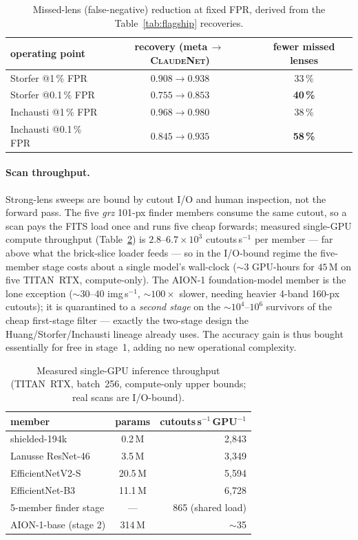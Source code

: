 \documentclass[11pt,letterpaper]{article}
\newcommand{\cnet}{\textsc{ClaudeNet}}
\newcommand{\aion}{\textsc{AION-1}}
\begin{document}
\begin{table}[t]\centering
\caption{Missed-lens (false-negative) reduction at fixed FPR, derived from the
Table~\ref{tab:flagship} recoveries.}
\label{tab:impact}
\begin{tabular}{lcc}
\toprule
operating point & recovery (meta$\,\to\,$\cnet{}) & fewer missed lenses\\
\midrule
Storfer @1\,\% FPR     & $0.908\to0.938$ & 33\,\%\\
Storfer @0.1\,\% FPR   & $0.755\to0.853$ & \textbf{40\,\%}\\
Inchausti @1\,\% FPR   & $0.968\to0.980$ & 38\,\%\\
Inchausti @0.1\,\% FPR & $0.845\to0.935$ & \textbf{58\,\%}\\
\bottomrule
\end{tabular}
\end{table}

\paragraph{Scan throughput.} Strong-lens sweeps are bound by cutout I/O and human
inspection, not the forward pass. The five \emph{grz} 101-px finder members consume
the same cutout, so a scan pays the FITS load once and runs five cheap forwards;
measured single-GPU compute throughput (Table~\ref{tab:throughput}) is
$2.8$--$6.7\times10^{3}$ cutouts\,s$^{-1}$ per member --- far above what the
brick-slice loader feeds --- so in the I/O-bound regime the five-member stage costs
about a single model's wall-clock ($\sim$3 GPU-hours for $45$\,M on five TITAN~RTX,
compute-only). The \aion{} foundation-model member is the lone exception
($\sim$30--40 img\,s$^{-1}$, $\sim$$100\times$ slower, needing heavier 4-band 160-px
cutouts); it is quarantined to a \emph{second stage} on the $\sim$$10^{4}$--$10^{6}$
survivors of the cheap first-stage filter --- exactly the two-stage design the
Huang/Storfer/Inchausti lineage already uses. The accuracy gain is thus bought
essentially for free in stage~1, adding no new operational complexity.

\begin{table}[t]\centering
\caption{Measured single-GPU inference throughput (TITAN~RTX, batch~256, compute-only
upper bounds; real scans are I/O-bound).}
\label{tab:throughput}
\begin{tabular}{lcr}
\toprule
member & params & cutouts\,s$^{-1}$\,GPU$^{-1}$\\
\midrule
shielded-194k             & 0.2\,M  & 2{,}843\\
Lanusse ResNet-46         & 3.5\,M  & 3{,}349\\
EfficientNetV2-S          & 20.5\,M & 5{,}594\\
EfficientNet-B3           & 11.1\,M & 6{,}728\\
5-member finder stage     & ---     & 865 (shared load)\\
\aion{}-base (stage 2)    & 314\,M  & $\sim$35\\
\bottomrule
\end{tabular}
\end{table}
\end{document}
